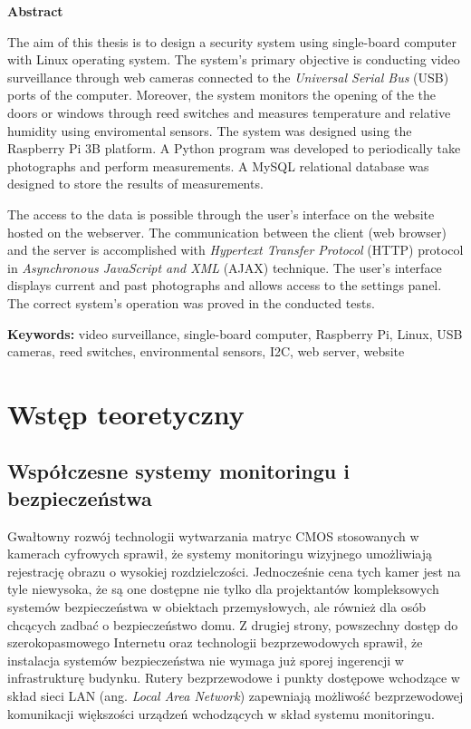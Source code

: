 \documentclass[a4paper,11pt,twoside]{article}
\begin{document}
\begin{center}
\textbf{Abstract}
\end{center}

\noindent
The aim of this thesis is to design a security system using single-board computer with Linux operating system. The system's primary objective is conducting video surveillance through web cameras connected to the \textit{Universal Serial Bus} (USB) ports of the computer. Moreover, the system monitors the opening of the the doors or windows through reed switches and measures temperature and relative humidity using enviromental sensors. The system was designed using the Raspberry Pi 3B platform. A Python program was developed to periodically take photographs and perform measurements. A MySQL relational database was designed to store the results of measurements.

The access to the data is possible through the user’s interface on the website hosted on the webserver. The communication between the client (web browser) and the server is accomplished with \textit{Hypertext Transfer Protocol} (HTTP) protocol in \textit{Asynchronous JavaScript and XML} (AJAX) technique. The user’s interface displays current and past photographs and allows access to the settings panel. The correct system's operation was proved in the conducted tests.

\vspace{11pt}
\noindent
\textbf{Keywords:} video surveillance, single-board computer, Raspberry Pi, Linux, USB cameras, reed switches, environmental sensors, I2C, web server, website 
\newpage

\null
\thispagestyle{empty}
\newpage



\null
\thispagestyle{empty}
\newpage

\tableofcontents
\setcounter{tocdepth}{2}
\newpage

\section{Wstęp teoretyczny}

\subsection{Współczesne systemy monitoringu i bezpieczeństwa}
Gwałtowny rozwój technologii wytwarzania matryc CMOS stosowanych w kamerach cyfrowych sprawił, że systemy monitoringu wizyjnego umożliwiają rejestrację obrazu o wysokiej rozdzielczości. Jednocześnie cena tych kamer jest na tyle niewysoka, że są one dostępne nie tylko dla projektantów kompleksowych systemów bezpieczeństwa w obiektach przemysłowych, ale również dla osób chcących zadbać o bezpieczeństwo domu. Z drugiej strony, powszechny dostęp do szerokopasmowego Internetu oraz technologii bezprzewodowych sprawił, że  instalacja systemów bezpieczeństwa nie wymaga już sporej ingerencji w infrastrukturę budynku. Rutery bezprzewodowe i punkty dostępowe wchodzące w skład sieci LAN (ang. \textit{Local Area Network}) zapewniają możliwość bezprzewodowej komunikacji większości urządzeń wchodzących w skład systemu monitoringu.
\end{document}

